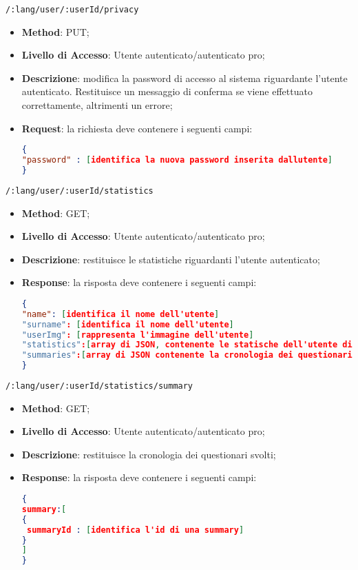 	\item \texttt{/:lang/user/:userId/privacy}
		\begin{itemize}
			\item \textbf{Method}: PUT;
			\item \textbf{Livello di Accesso}: Utente autenticato/autenticato pro;
			\item \textbf{Descrizione}: modifica la password di accesso al sistema riguardante l'utente autenticato. Restituisce un messaggio di conferma se viene effettuato correttamente, altrimenti un errore;
			\item \textbf{Request}: la richiesta deve contenere i seguenti campi:	
\begin{lstlisting}[language=json,firstnumber=1]
{
"password" : [identifica la nuova password inserita dallutente]
}	

\end{lstlisting}
		\end{itemize}
		
	\item \texttt{/:lang/user/:userId/statistics}
		\begin{itemize}
			\item \textbf{Method}: GET;
			\item \textbf{Livello di Accesso}: Utente autenticato/autenticato pro;
			\item \textbf{Descrizione}: restituisce le statistiche riguardanti l'utente autenticato; 
			\item \textbf{Response}: la risposta deve contenere i seguenti campi:	
\begin{lstlisting}[language=json,firstnumber=1]
{
"name": [identifica il nome dell'utente]
"surname": [identifica il nome dell'utente]
"userImg": [rappresenta l'immagine dell'utente]
"statistics":[array di JSON, contenente le statische dell'utente di ogni argomento]
"summaries":[array di JSON contenente la cronologia dei questionari svolti dall'utente]   
}	

\end{lstlisting}
		\end{itemize}

\item \texttt{/:lang/user/:userId/statistics/summary}
	\begin{itemize}
		\item \textbf{Method}: GET;
		\item \textbf{Livello di Accesso}: Utente autenticato/autenticato pro;
		\item \textbf{Descrizione}: restituisce la cronologia dei questionari svolti; 
		\item \textbf{Response}: la risposta deve contenere i seguenti campi:	
\begin{lstlisting}[language=json,firstnumber=1]
{
summary:[
{
 summaryId : [identifica l'id di una summary]
}
]
}	
\end{lstlisting}
	\end{itemize}		

